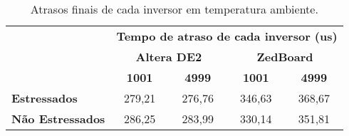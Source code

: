 \begin{table}[H]
\centering
\caption{Atrasos finais de cada inversor em temperatura ambiente.}
\begin{tabular}{l|cccc|}
\cline{2-5}
 & \multicolumn{4}{c|}{\textbf{Tempo de atraso de cada inversor (us)}} \\ \cline{2-5} 
 & \multicolumn{2}{c|}{\textbf{Altera DE2}} & \multicolumn{2}{c|}{\textbf{ZedBoard}} \\ \cline{2-5} 
 & \multicolumn{1}{c|}{\textbf{1001}} & \multicolumn{1}{c|}{\textbf{4999}} & \multicolumn{1}{c|}{\textbf{1001}} & \textbf{4999} \\ \hline
\multicolumn{1}{|l|}{\textbf{Estressados}} & \multicolumn{1}{c|}{279,21} & \multicolumn{1}{c|}{276,76} & \multicolumn{1}{c|}{346,63} & 368,67 \\ \hline
\multicolumn{1}{|l|}{\textbf{Não Estressados}} & \multicolumn{1}{c|}{286,25} & \multicolumn{1}{c|}{283,99} & \multicolumn{1}{c|}{330,14} & 351,81 \\ \hline
\end{tabular}
\label{tab:FreqIniciais}
\end{table}